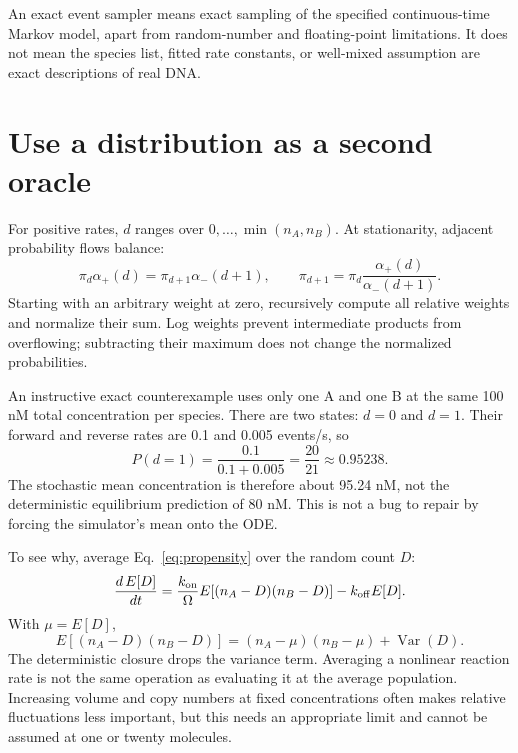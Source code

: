 
An exact event sampler means exact sampling of the specified continuous-time
Markov model, apart from random-number and floating-point limitations.
It does not mean the species list, fitted rate constants, or well-mixed
assumption are exact descriptions of real DNA.

\section{Use a distribution as a second oracle}

For positive rates, $d$ ranges over $0,\ldots,\min(n_A,n_B)$.
At stationarity, adjacent probability flows balance:
\begin{equation}
 \pi_d\alpha_+(d)=\pi_{d+1}\alpha_-(d+1),\qquad
 \pi_{d+1}=\pi_d\frac{\alpha_+(d)}{\alpha_-(d+1)}.
 \label{eq:stationary}
\end{equation}
Starting with an arbitrary weight at zero, recursively compute all
relative weights and normalize their sum. Log weights prevent intermediate
products from overflowing; subtracting their maximum does not change the
normalized probabilities.


An instructive exact counterexample uses only one A and one B at the
same 100 nM total concentration per species. There are two states:
$d=0$ and $d=1$. Their forward and reverse rates are 0.1 and 0.005
events/s, so
\begin{equation}
 P(d=1)=\frac{0.1}{0.1+0.005}=\frac{20}{21}\approx0.95238.
\end{equation}
The stochastic mean concentration is therefore about 95.24 nM,
not the deterministic equilibrium prediction of 80 nM. This is not
a bug to repair by forcing the simulator's mean onto the ODE.

To see why, average Eq.~\ref{eq:propensity} over the random count $D$:
\begin{equation}
 \frac{d\,E[D]}{dt}=
 \frac{k_{\rm on}}{\Omega}E[(n_A-D)(n_B-D)]-k_{\rm off}E[D].
\end{equation}
With $\mu=E[D]$,
\begin{equation}
 E[(n_A-D)(n_B-D)]=(n_A-\mu)(n_B-\mu)+\operatorname{Var}(D).
\end{equation}
The deterministic closure drops the variance term. Averaging a nonlinear
reaction rate is not the same operation as evaluating it at the average
population. Increasing volume and copy numbers at fixed concentrations
often makes relative fluctuations less important, but this needs an
appropriate limit and cannot be assumed at one or twenty molecules.

